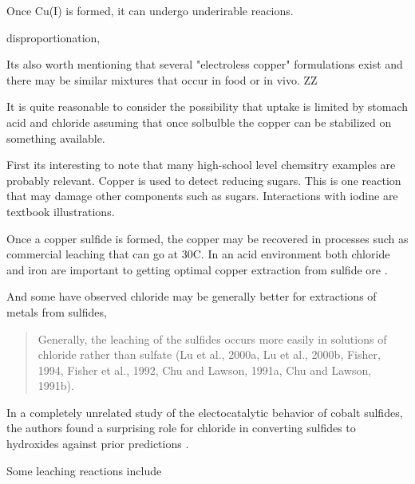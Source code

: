 


Once Cu(I) is formed, it can undergo underirable reacions.

\cite{SAMUNI_ARONOVITCH_GODINGER_cytotoxicity_1983}


disproportionation,


Its also worth mentioning that several "electroless copper"
formulations exist and there may be similar mixtures
that occur in food or in vivo. ZZ


It is quite reasonable to consider the possibility that
uptake is limited by stomach acid and chloride assuming
that once solbulble the copper can be stabilized on something
available. 


First its interesting to note that many high-school
level chemsitry examples are probably relevant. 
Copper is used to detect reducing sugars.
This is one reaction that may damage other components
such as sugars.
Interactions with iodine are textbook illustrations.


Once a copper sulfide is formed, the copper may be recovered
in processes such as commercial leaching that can go at
30C. In an acid environment both chloride and iron 
are important to getting optimal copper extraction from 
sulfide ore 
\cite{Salinas_Herreros_Torres_Leaching_Primary_Copper_2018}.

And some have observed chloride may be generally better
for extractions of metals from sulfides, 
\cite{Herreros_Vinals_Leaching_sulfide_copper_2007}
\begin{quote}
Generally, the leaching of the sulfides occurs more easily in solutions of chloride rather than sulfate (Lu et al., 2000a, Lu et al., 2000b, Fisher, 1994, Fisher et al., 1992, Chu and Lawson, 1991a, Chu and Lawson, 1991b). 
\end{quote}
In a completely unrelated study of the electocatalytic behavior of
cobalt sulfides, the authors found a surprising role for chloride
in converting sulfides to hydroxides against prior predictions
\cite{PMID39915902}.

Some leaching reactions include 
\cite{Schlesinger_King_Sole_Hydrometallurgical_Copper_Extraction_2011}


